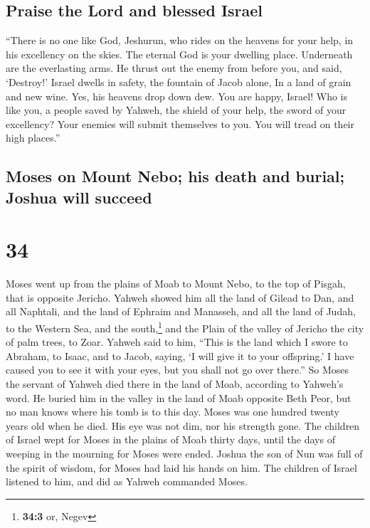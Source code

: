 \hypertarget{praise-the-lord-and-blessed-israel}{%
\subsection{Praise the Lord and blessed
Israel}\label{praise-the-lord-and-blessed-israel}}

 ``There is no one like God, Jeshurun, who rides on the
heavens for your help, in his excellency on the skies. 
The eternal God is your dwelling place. Underneath are the everlasting
arms. He thrust out the enemy from before you, and said, `Destroy!'
 Israel dwells in safety, the fountain of Jacob alone, In
a land of grain and new wine. Yes, his heavens drop down dew.
 You are happy, Israel! Who is like you, a people saved
by Yahweh, the shield of your help, the sword of your excellency? Your
enemies will submit themselves to you. You will tread on their high
places.''

\hypertarget{moses-on-mount-nebo-his-death-and-burial-joshua-will-succeed}{%
\subsection{Moses on Mount Nebo; his death and burial; Joshua will
succeed}\label{moses-on-mount-nebo-his-death-and-burial-joshua-will-succeed}}

\hypertarget{section-33}{%
\section{34}\label{section-33}}

 Moses went up from the plains of Moab to Mount Nebo, to
the top of Pisgah, that is opposite Jericho. Yahweh showed him all the
land of Gilead to Dan,  and all Naphtali, and the land of
Ephraim and Manasseh, and all the land of Judah, to the Western Sea,
 and the south,\footnote{\textbf{34:3} or, Negev} and the
Plain of the valley of Jericho the city of palm trees, to Zoar.
 Yahweh said to him, ``This is the land which I swore to
Abraham, to Isaac, and to Jacob, saying, `I will give it to your
offspring.' I have caused you to see it with your eyes, but you shall
not go over there.''  So Moses the servant of Yahweh died
there in the land of Moab, according to Yahweh's word.  He
buried him in the valley in the land of Moab opposite Beth Peor, but no
man knows where his tomb is to this day.  Moses was one
hundred twenty years old when he died. His eye was not dim, nor his
strength gone.  The children of Israel wept for Moses in
the plains of Moab thirty days, until the days of weeping in the
mourning for Moses were ended.  Joshua the son of Nun was
full of the spirit of wisdom, for Moses had laid his hands on him. The
children of Israel listened to him, and did as Yahweh commanded Moses.

